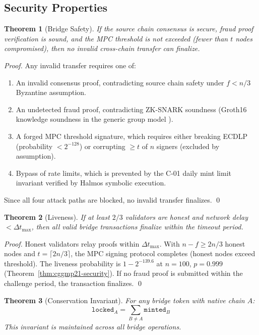 \documentclass[11pt]{article}
\newtheorem{theorem}{Theorem}
\begin{document}
\subsection{Security Properties}

\begin{theorem}[Bridge Safety]
If the source chain consensus is secure, fraud proof verification is sound, and the MPC threshold is not exceeded (fewer than $t$ nodes compromised), then no invalid cross-chain transfer can finalize.
\end{theorem}

\begin{proof}
Any invalid transfer requires one of:
\begin{enumerate}
  \item An invalid consensus proof, contradicting source chain safety under $f < n/3$ Byzantine assumption.
  \item An undetected fraud proof, contradicting ZK-SNARK soundness (Groth16 knowledge soundness in the generic group model \cite{groth2016size}).
  \item A forged MPC threshold signature, which requires either breaking ECDLP (probability $< 2^{-128}$) or corrupting $\geq t$ of $n$ signers (excluded by assumption).
  \item Bypass of rate limits, which is prevented by the C-01 daily mint limit invariant verified by Halmos symbolic execution.
\end{enumerate}
Since all four attack paths are blocked, no invalid transfer finalizes. \qed
\end{proof}

\begin{theorem}[Liveness]
If at least $2/3$ validators are honest and network delay $< \Delta t_{\text{max}}$, then all valid bridge transactions finalize within the timeout period.
\end{theorem}

\begin{proof}
Honest validators relay proofs within $\Delta t_{\text{max}}$. With $n - f \geq 2n/3$ honest nodes and $t = \lceil 2n/3 \rceil$, the MPC signing protocol completes (honest nodes exceed threshold). The liveness probability is $1 - 2^{-139.6}$ at $n = 100$, $p = 0.999$ (Theorem~\ref{thm:cggmp21-security}). If no fraud proof is submitted within the challenge period, the transaction finalizes. \qed
\end{proof}

\begin{theorem}[Conservation Invariant]
For any bridge token with native chain $A$:
\begin{equation}
\texttt{locked}_A = \sum_{B \neq A} \texttt{minted}_B
\end{equation}
This invariant is maintained across all bridge operations.
\end{theorem}
\end{document}
